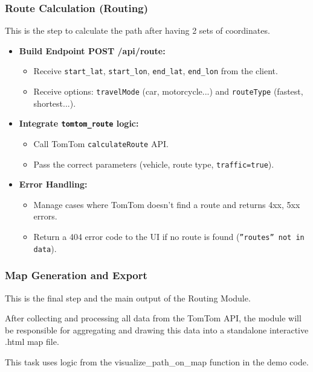 \subsubsection{Route Calculation (Routing)}
This is the step to calculate the path after having 2 sets of coordinates.
\begin{itemize}
  \item \textbf{Build Endpoint POST /api/route:}
    \begin{itemize}
        \item Receive \texttt{start\_lat}, \texttt{start\_lon}, \texttt{end\_lat}, \texttt{end\_lon} from the client.
        \item Receive options: \texttt{travelMode} (car, motorcycle...) and \texttt{routeType} (fastest, shortest...).
    \end{itemize}
  \item \textbf{Integrate \texttt{tomtom\_route} logic:}
    \begin{itemize}
        \item Call TomTom \texttt{calculateRoute} API.
        \item Pass the correct parameters (vehicle, route type, \texttt{traffic=true}).
    \end{itemize}
  \item \textbf{Error Handling:}
    \begin{itemize}
        \item Manage cases where TomTom doesn't find a route and returns 4xx, 5xx errors.
        \item Return a 404 error code to the UI if no route is found (\texttt{''routes'' not in data}).
    \end{itemize}
\end{itemize}

\subsubsection{Map Generation and Export}
This is the final step and the main output of the Routing Module.

After collecting and processing all data from the TomTom API, the module will be responsible for aggregating and drawing this data into a standalone interactive .html map file.

This task uses logic from the visualize\_path\_on\_map function in the demo code.

